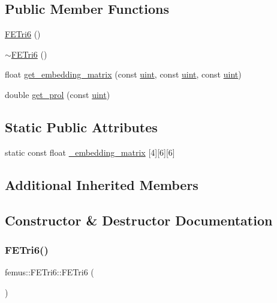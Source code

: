 \subsection*{Public Member Functions}
\begin{DoxyCompactItemize}
\item 
\mbox{\hyperlink{classfemus_1_1_f_e_tri6_aa3208872d1f49f71e093185fcb6db463}{F\+E\+Tri6}} ()
\item 
\mbox{\hyperlink{classfemus_1_1_f_e_tri6_a38e0ee192d84fafe8530a8fbd0c4c1a9}{$\sim$\+F\+E\+Tri6}} ()
\item 
float \mbox{\hyperlink{classfemus_1_1_f_e_tri6_ab279faaaec620922946e9a1119493607}{get\+\_\+embedding\+\_\+matrix}} (const \mbox{\hyperlink{_typedefs_8hpp_a91ad9478d81a7aaf2593e8d9c3d06a14}{uint}}, const \mbox{\hyperlink{_typedefs_8hpp_a91ad9478d81a7aaf2593e8d9c3d06a14}{uint}}, const \mbox{\hyperlink{_typedefs_8hpp_a91ad9478d81a7aaf2593e8d9c3d06a14}{uint}})
\item 
double \mbox{\hyperlink{classfemus_1_1_f_e_tri6_a8e08d8a2985f51295992730f2d13c299}{get\+\_\+prol}} (const \mbox{\hyperlink{_typedefs_8hpp_a91ad9478d81a7aaf2593e8d9c3d06a14}{uint}})
\end{DoxyCompactItemize}
\subsection*{Static Public Attributes}
\begin{DoxyCompactItemize}
\item 
static const float \mbox{\hyperlink{classfemus_1_1_f_e_tri6_a7d8121c60698e43c7fdd3652f8224255}{\+\_\+embedding\+\_\+matrix}} \mbox{[}4\mbox{]}\mbox{[}6\mbox{]}\mbox{[}6\mbox{]}
\end{DoxyCompactItemize}
\subsection*{Additional Inherited Members}


\subsection{Constructor \& Destructor Documentation}
\mbox{\label{classfemus_1_1_f_e_tri6_aa3208872d1f49f71e093185fcb6db463}} 
\subsubsection{\texorpdfstring{F\+E\+Tri6()}{FETri6()}}
{\footnotesize\ttfamily femus\+::\+F\+E\+Tri6\+::\+F\+E\+Tri6 (\begin{DoxyParamCaption}{ }\end{DoxyParamCaption})}

